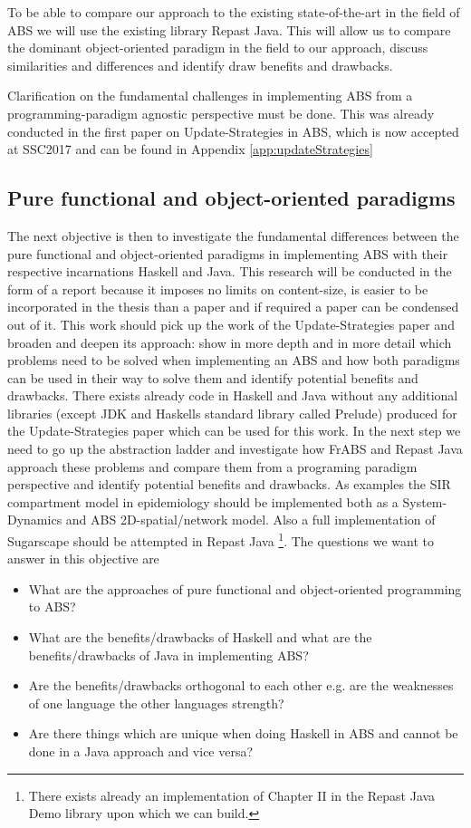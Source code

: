 To be able to compare our approach to the existing state-of-the-art in the field of ABS we will use the existing library Repast Java. This will allow us to compare the dominant object-oriented paradigm in the field to our approach, discuss similarities and differences and identify draw benefits and drawbacks. 

Clarification on the fundamental challenges in implementing ABS from a programming-paradigm agnostic perspective must be done. This was already conducted in the first paper on Update-Strategies in ABS, which is now accepted at SSC2017 and can be found in Appendix \ref{app:updateStrategies}

\subsection{Pure functional and object-oriented paradigms}
The next objective is then to investigate the fundamental differences between the pure functional and object-oriented paradigms in implementing ABS with their respective incarnations Haskell and Java. This research will be conducted in the form of a report because it imposes no limits on content-size, is easier to be incorporated in the thesis than a paper and if required a paper can be condensed out of it.
This work should pick up the work of the Update-Strategies paper and broaden and deepen its approach: show in more depth and in more detail which problems need to be solved when implementing an ABS and how both paradigms can be used in their way to solve them and identify potential benefits and drawbacks. There exists already code in Haskell and Java without any additional libraries (except JDK and Haskells standard library called Prelude) produced for the Update-Strategies paper which can be used for this work.
In the next step we need to go up the abstraction ladder and investigate how FrABS and Repast Java approach these problems and compare them from a programing paradigm perspective and identify potential benefits and drawbacks.
As examples the SIR compartment model in epidemiology should be implemented both as a System-Dynamics and ABS 2D-spatial/network model. Also a full implementation of Sugarscape should be attempted in Repast Java \footnote{There exists already an implementation of Chapter II in the Repast Java Demo library upon which we can build.}.
The questions we want to answer in this objective are
\begin{itemize}
	\item What are the approaches of pure functional and object-oriented programming to ABS?
	\item What are the benefits/drawbacks of Haskell and what are the benefits/drawbacks of Java in implementing ABS?
	\item Are the benefits/drawbacks orthogonal to each other e.g. are the weaknesses of one language the other languages strength?
	\item Are there things which are unique when doing Haskell in ABS and cannot be done in a Java approach and vice versa?
\end{itemize}

